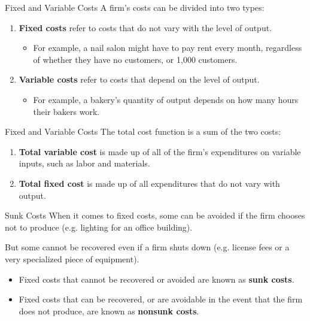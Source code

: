 \documentclass{beamer}
\begin{document}
\begin{frame}{Fixed and Variable Costs}
  A firm's costs can be divided into two types:

  \begin{enumerate}
    \item \textbf{Fixed costs} refer to costs that do not vary with the level of output.
    
    \begin{itemize}
      \item For example, a nail salon might have to pay rent every month, regardless of whether they have no customers, or 1,000 customers.
    \end{itemize}
    
    \item \textbf{Variable costs} refer to costs that depend on the level of output.
  
    \begin{itemize}
      \item For example, a bakery's quantity of output depends on how many hours their bakers work.
    \end{itemize}
  \end{enumerate}
\end{frame}

\begin{frame}{Fixed and Variable Costs}
  The total cost function is a sum of the two costs:
  
  \begin{enumerate}
    \item \textbf{Total variable cost} is made up of all of the firm's expenditures on variable inputs, such as labor and materials.
    \item \textbf{Total fixed cost} is made up of all expenditures that do not vary with output.
  \end{enumerate}
\end{frame}

\begin{frame}{Sunk Costs}
  When it comes to fixed costs, some can be avoided if the firm chooses not to produce (e.g. lighting for an office building).

  \bigskip
  But some cannot be recovered even if a firm shuts down (e.g. license fees or a very specialized piece of equipment).

  \begin{itemize}
    \item Fixed costs that cannot be recovered or avoided are known as \textbf{sunk costs}.
  
    \item Fixed costs that can be recovered, or are avoidable in the event that the firm does not produce, are known as \textbf{nonsunk costs}.
  \end{itemize}
\end{frame}
\end{document}

